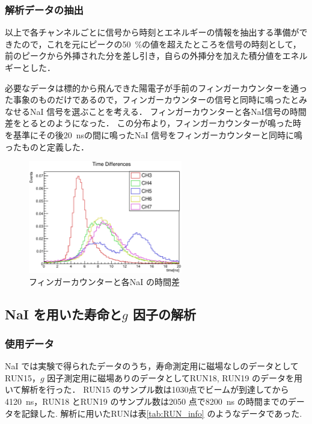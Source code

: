 \subsubsection{解析データの抽出}
以上で各チャンネルごとに信号から時刻とエネルギーの情報を抽出する準備ができたので，これを元にピークの50~\%の値を超えたところを信号の時刻として，前のピークから外挿された分を差し引き，自らの外挿分を加えた積分値をエネルギーとした．

必要なデータは標的から飛んできた陽電子が手前のフィンガーカウンターを通った事象のものだけであるので，フィンガーカウンターの信号と同時に鳴ったとみなせるNaI 信号を選ぶことを考える．
フィンガーカウンターと各NaI信号の時間差をとるとのようになった．
この分布より，フィンガーカウンターが鳴った時を基準にその後20~nsの間に鳴ったNaI 信号をフィンガーカウンターと同時に鳴ったものと定義した．

\begin{figure}[hbt]
\centering
\includegraphics[width=0.6\textwidth]{figure/hatano/coincidence.eps}
\caption{フィンガーカウンターと各NaI の時間差}
\label{hatano_fig:coincidence}
\end{figure}


\subsection{NaI を用いた寿命と$g$ 因子の解析}
\subsubsection{使用データ}
NaI では実験で得られたデータのうち，寿命測定用に磁場なしのデータとしてRUN15，$g$ 因子測定用に磁場ありのデータとしてRUN18, RUN19 のデータを用いて解析を行った．
RUN15 のサンプル数は1030点でビームが到達してから4120~ns，RUN18 とRUN19 のサンプル数は2050 点で8200~ns の時間までのデータを記録した.
解析に用いたRUNは表\ref{tab:RUN_info} のようなデータであった.

